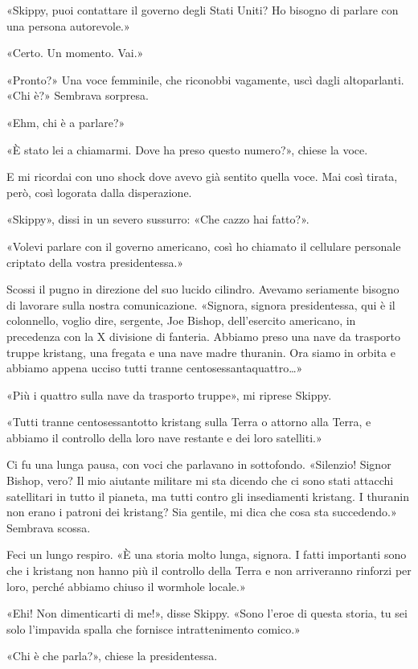 «Skippy, puoi contattare il governo degli Stati Uniti? Ho bisogno di
parlare con una persona autorevole.»

«Certo. Un momento. Vai.»

«Pronto?» Una voce femminile, che riconobbi vagamente, uscì dagli
altoparlanti. «Chi è?» Sembrava sorpresa.

«Ehm, chi è a parlare?»

«È stato lei a chiamarmi. Dove ha preso questo numero?», chiese la voce.

E mi ricordai con uno shock dove avevo già sentito quella voce. Mai così
tirata, però, così logorata dalla disperazione.

«Skippy», dissi in un severo sussurro: «Che cazzo hai fatto?».

«Volevi parlare con il governo americano, così ho chiamato il cellulare
personale criptato della vostra presidentessa.»

Scossi il pugno in direzione del suo lucido cilindro. Avevamo seriamente
bisogno di lavorare sulla nostra comunicazione. «Signora, signora
presidentessa, qui è il colonnello, voglio dire, sergente, Joe Bishop,
dell'esercito americano, in precedenza con la X divisione di fanteria.
Abbiamo preso una nave da trasporto truppe kristang, una fregata e una
nave madre thuranin. Ora siamo in orbita e abbiamo appena ucciso tutti
tranne centosessantaquattro\ldots»

«Più i quattro sulla nave da trasporto truppe», mi riprese Skippy.

«Tutti tranne centosessantotto kristang sulla Terra o attorno alla
Terra, e abbiamo il controllo della loro nave restante e dei loro
satelliti.»

Ci fu una lunga pausa, con voci che parlavano in sottofondo. «Silenzio!
Signor Bishop, vero? Il mio aiutante militare mi sta dicendo che ci sono
stati attacchi satellitari in tutto il pianeta, ma tutti contro gli
insediamenti kristang. I thuranin non erano i patroni dei kristang? Sia
gentile, mi dica che cosa sta succedendo.» Sembrava scossa.

Feci un lungo respiro. «È una storia molto lunga, signora. I fatti
importanti sono che i kristang non hanno più il controllo della Terra e
non arriveranno rinforzi per loro, perché abbiamo chiuso il wormhole
locale.»

«Ehi! Non dimenticarti di me!», disse Skippy. «Sono l'eroe di questa
storia, tu sei solo l'impavida spalla che fornisce intrattenimento
comico.»

«Chi è che parla?», chiese la presidentessa.

